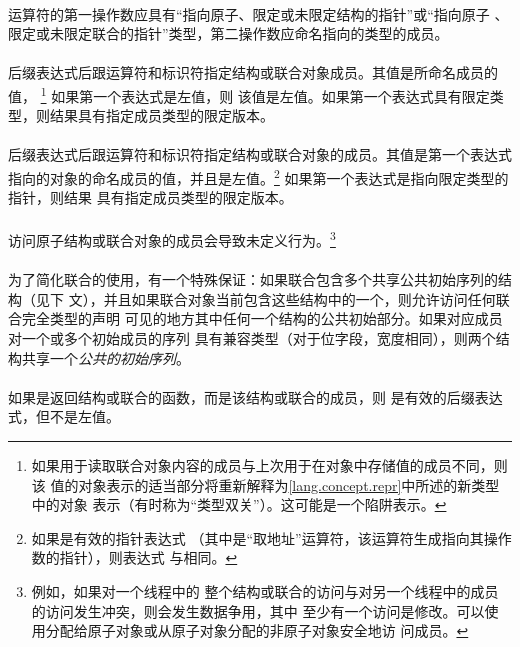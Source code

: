 {\paragraph{}
运算符\tm{->}的第一操作数应具有``指向原子、限定或未限定结构的指针''或``指向原子
、限定或未限定联合的指针''类型，第二操作数应命名指向的类型的成员。

\semantic
\paragraph{}
后缀表达式后跟运算符和标识符指定结构或联合对象成员。其值是所命名成员的值，
\footnote{如果用于读取联合对象内容的成员与上次用于在对象中存储值的成员不同，则该
值的对象表示的适当部分将重新解释为\ref{lang.concept.repr}中所述的新类型中的对象
表示（有时称为``类型双关''）。这可能是一个陷阱表示。} 如果第一个表达式是左值，则
该值是左值。如果第一个表达式具有限定类型，则结果具有指定成员类型的限定版本。

\paragraph{}
后缀表达式后跟\tm{->}运算符和标识符指定结构或联合对象的成员。其值是第一个表达式
指向的对象的命名成员的值，并且是左值。\footnote{如果是有效的指针表达式
（其中\tm{\&}是``取地址''运算符，该运算符生成指向其操作数的指针），则表达式
与相同。} 如果第一个表达式是指向限定类型的指针，则结果
具有指定成员类型的限定版本。

\paragraph{}
访问原子结构或联合对象的成员会导致未定义行为。\footnote{例如，如果对一个线程中的
整个结构或联合的访问与对另一个线程中的成员的访问发生冲突，则会发生数据争用，其中
至少有一个访问是修改。可以使用分配给原子对象或从原子对象分配的非原子对象安全地访
问成员。}

\paragraph{}
为了简化联合的使用，有一个特殊保证：如果联合包含多个共享公共初始序列的结构（见下
文），并且如果联合对象当前包含这些结构中的一个，则允许访问任何联合完全类型的声明
可见的地方其中任何一个结构的公共初始部分。如果对应成员对一个或多个初始成员的序列
具有兼容类型（对于位字段，宽度相同），则两个结构共享一个\textit{公共的初始序列}。

\paragraph{}
\ex 如果是返回结构或联合的函数，而是该结构或联合的成员，则
是有效的后缀表达式，但不是左值。

}
